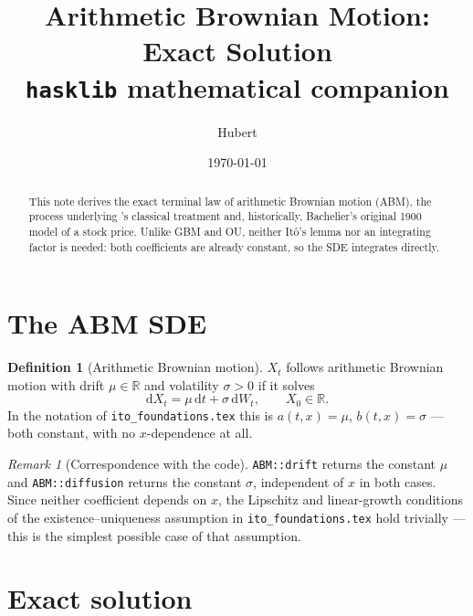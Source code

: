 \documentclass[11pt]{article}
\title{Arithmetic Brownian Motion: Exact Solution\\
       \large \texttt{hasklib} mathematical companion}
\author{Hubert}
\date{\today}
\newcommand{\dd}{\mathrm{d}}
\newcommand{\dW}{\dd W_t}
\newcommand{\dt}{\dd t}
\newcommand{\R}{\mathbb{R}}
\newcommand{\drift}{a}
\newcommand{\diff}{b}
\theoremstyle{plain}
\theoremstyle{definition}
\newtheorem{definition}{Definition}
\theoremstyle{remark}
\newtheorem{remark}{Remark}
\begin{document}
\maketitle

\begin{abstract}
This note derives the exact terminal law of arithmetic Brownian
motion (ABM), the process underlying 's
classical treatment and, historically, Bachelier's original 1900
model of a stock price. Unlike GBM and OU, neither It\^o's lemma nor
an integrating factor is needed: both coefficients are already
constant, so the SDE integrates directly.
\end{abstract}

\section{The ABM SDE}

\begin{definition}[Arithmetic Brownian motion]\label{def:abm}
$X_t$ follows arithmetic Brownian motion with drift $\mu\in\R$ and
volatility $\sigma>0$ if it solves
\begin{equation}\label{eq:abmsde}
   \dd X_t = \mu\,\dt + \sigma\,\dW, \qquad X_0\in\R.
\end{equation}
In the notation of \texttt{ito\_foundations.tex} this is
$\drift(t,x)=\mu$, $\diff(t,x)=\sigma$ --- both constant, with no
$x$-dependence at all.
\end{definition}

\begin{remark}[Correspondence with the code]
\texttt{ABM::drift} returns the constant $\mu$ and
\texttt{ABM::diffusion} returns the constant $\sigma$, independent of
$x$ in both cases. Since neither coefficient depends on $x$, the
Lipschitz and linear-growth conditions of the existence--uniqueness
assumption in \texttt{ito\_foundations.tex} hold trivially --- this is
the simplest possible case of that assumption.
\end{remark}

\section{Exact solution}
\end{document}
